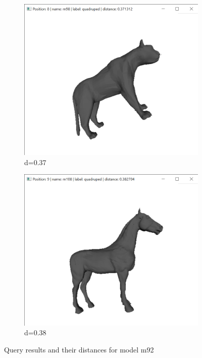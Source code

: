 \documentclass{bigdata}
\begin{document}
\begin{figure}[h!]
\begin{subfigure}[b]{0.09\linewidth}
    \includegraphics[width=\linewidth]{Pictures/Evaluation/m92/pos8.png}
    \caption*{d=0.37}
  \end{subfigure}
  \begin{subfigure}[b]{0.09\linewidth}
    \includegraphics[width=\linewidth]{Pictures/Evaluation/m92/pos9.png}
    \caption*{d=0.38}
  \end{subfigure}
  \caption{Query results and their distances for model m92}
  \label{fig:bunny}
\end{figure}
\end{document}
